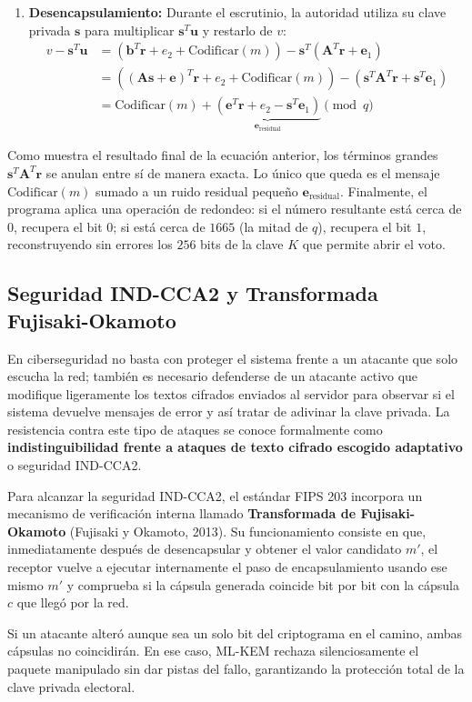 \begin{enumerate}
	\item \textbf{Desencapsulamiento:}
	Durante el escrutinio, la autoridad utiliza su clave privada $\mathbf{s}$ para multiplicar $\mathbf{s}^T \mathbf{u}$ y restarlo de $v$:
	\begin{align}
		v - \mathbf{s}^T \mathbf{u} &= \left( \mathbf{b}^T \mathbf{r} + e_2 + \text{Codificar}(m) \right) - \mathbf{s}^T \left( \mathbf{A}^T \mathbf{r} + \mathbf{e}_1 \right) \nonumber \\
		&= \left( (\mathbf{A}\mathbf{s} + \mathbf{e})^T \mathbf{r} + e_2 + \text{Codificar}(m) \right) - \left( \mathbf{s}^T \mathbf{A}^T \mathbf{r} + \mathbf{s}^T \mathbf{e}_1 \right) \nonumber \\
		&= \text{Codificar}(m) + \underbrace{\left( \mathbf{e}^T \mathbf{r} + e_2 - \mathbf{s}^T \mathbf{e}_1 \right)}_{\mathbf{e}_{\text{residual}}} \pmod q
	\end{align}
\end{enumerate}

Como muestra el resultado final de la ecuación anterior, los términos grandes $\mathbf{s}^T \mathbf{A}^T \mathbf{r}$ se anulan entre sí de manera exacta. Lo único que queda es el mensaje $\text{Codificar}(m)$ sumado a un ruido residual pequeño $\mathbf{e}_{\text{residual}}$. Finalmente, el programa aplica una operación de redondeo: si el número resultante está cerca de $0$, recupera el bit $0$; si está cerca de $1665$ (la mitad de $q$), recupera el bit $1$, reconstruyendo sin errores los $256$ bits de la clave $K$ que permite abrir el voto.

\subsection{Seguridad IND-CCA2 y Transformada Fujisaki-Okamoto}

En ciberseguridad no basta con proteger el sistema frente a un atacante que solo escucha la red; también es necesario defenderse de un atacante activo que modifique ligeramente los textos cifrados enviados al servidor para observar si el sistema devuelve mensajes de error y así tratar de adivinar la clave privada. La resistencia contra este tipo de ataques se conoce formalmente como \textbf{indistinguibilidad frente a ataques de texto cifrado escogido adaptativo} o seguridad IND-CCA2.

Para alcanzar la seguridad IND-CCA2, el estándar FIPS 203 incorpora un mecanismo de verificación interna llamado \textbf{Transformada de Fujisaki-Okamoto} (Fujisaki y Okamoto, 2013). Su funcionamiento consiste en que, inmediatamente después de desencapsular y obtener el valor candidato $m'$, el receptor vuelve a ejecutar internamente el paso de encapsulamiento usando ese mismo $m'$ y comprueba si la cápsula generada coincide bit por bit con la cápsula $c$ que llegó por la red.

Si un atacante alteró aunque sea un solo bit del criptograma en el camino, ambas cápsulas no coincidirán. En ese caso, ML-KEM rechaza silenciosamente el paquete manipulado sin dar pistas del fallo, garantizando la protección total de la clave privada electoral.

